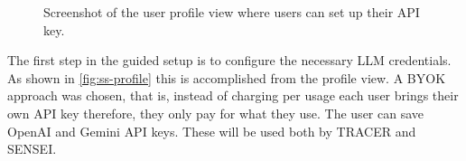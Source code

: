\begin{figure}[!htb]
  \centering
  \caption{Screenshot of the user profile view where users can set up their API key.}
  \label{fig:ss-profile}
\end{figure}

The first step in the guided setup
is to configure the necessary \ac{LLM} credentials.
As shown in \autoref{fig:ss-profile}
this is accomplished from the profile view.
A \ac{BYOK} approach was chosen,
that is, instead of charging per usage
each user brings their own \ac{API} key
therefore, they only pay for what they use.
The user can save OpenAI and Gemini \ac{API} keys.
These will be used both by \ac{TRACER} and SENSEI.

